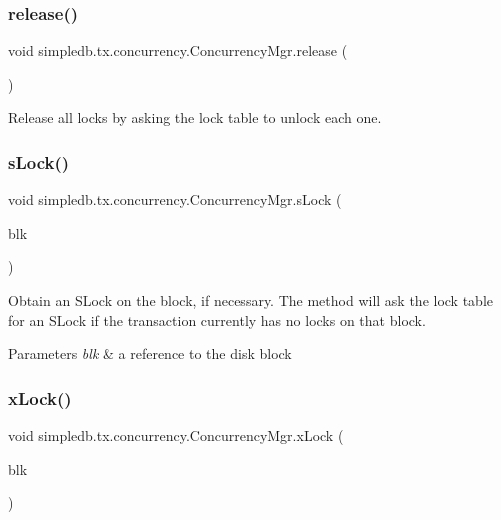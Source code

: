 \subsubsection{\texorpdfstring{release()}{release()}}
{\footnotesize\ttfamily void simpledb.\+tx.\+concurrency.\+Concurrency\+Mgr.\+release (\begin{DoxyParamCaption}{ }\end{DoxyParamCaption})\hspace{0.3cm}{\ttfamily [inline]}}

Release all locks by asking the lock table to unlock each one. \mbox{\label{classsimpledb_1_1tx_1_1concurrency_1_1ConcurrencyMgr_abf21a565749b8a624c69a304beff2038}} 
\subsubsection{\texorpdfstring{s\+Lock()}{sLock()}}
{\footnotesize\ttfamily void simpledb.\+tx.\+concurrency.\+Concurrency\+Mgr.\+s\+Lock (\begin{DoxyParamCaption}\item[{\hyperlink{classsimpledb_1_1file_1_1BlockId}{Block\+Id}}]{blk }\end{DoxyParamCaption})\hspace{0.3cm}{\ttfamily [inline]}}

Obtain an S\+Lock on the block, if necessary. The method will ask the lock table for an S\+Lock if the transaction currently has no locks on that block. 
\begin{DoxyParams}{Parameters}
{\em blk} & a reference to the disk block \\
\hline
\end{DoxyParams}
\mbox{\label{classsimpledb_1_1tx_1_1concurrency_1_1ConcurrencyMgr_af92234d0ce20f0913bd6306026969055}} 
\subsubsection{\texorpdfstring{x\+Lock()}{xLock()}}
{\footnotesize\ttfamily void simpledb.\+tx.\+concurrency.\+Concurrency\+Mgr.\+x\+Lock (\begin{DoxyParamCaption}\item[{\hyperlink{classsimpledb_1_1file_1_1BlockId}{Block\+Id}}]{blk }\end{DoxyParamCaption})\hspace{0.3cm}{\ttfamily [inline]}}

